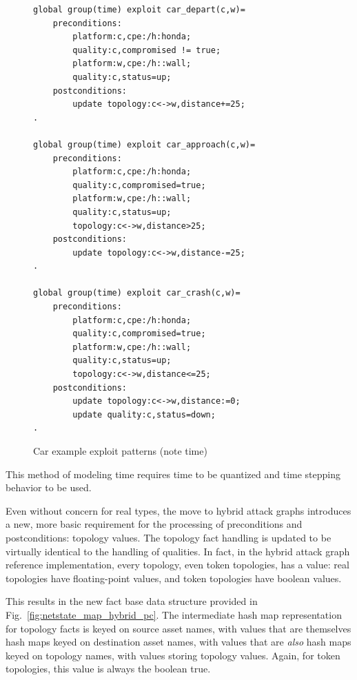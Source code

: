 \begin{figure}
\begin{lstlisting}
global group(time) exploit car_depart(c,w)=
    preconditions:
        platform:c,cpe:/h:honda;
        quality:c,compromised != true;
        platform:w,cpe:/h::wall;
        quality:c,status=up;
    postconditions:
        update topology:c<->w,distance+=25;
.

global group(time) exploit car_approach(c,w)=
    preconditions:
        platform:c,cpe:/h:honda;
        quality:c,compromised=true;
        platform:w,cpe:/h::wall;
        quality:c,status=up;
        topology:c<->w,distance>25;
    postconditions:
        update topology:c<->w,distance-=25;
.

global group(time) exploit car_crash(c,w)=
    preconditions:
        platform:c,cpe:/h:honda;
        quality:c,compromised=true;
        platform:w,cpe:/h::wall;
        quality:c,status=up;
        topology:c<->w,distance<=25;
    postconditions:
        update topology:c<->w,distance:=0;
        update quality:c,status=down;
.
\end{lstlisting}
\caption{Car example exploit patterns (note time)}
\label{fig:illustrative_time_xp}
\end{figure}

This method of modeling time requires time to be quantized and time stepping
behavior to be used. 

Even without concern for real types, the move to hybrid attack graphs 
introduces a new, more basic requirement for the processing of preconditions
and postconditions: topology values. The topology fact handling is updated
to be virtually identical to the handling of qualities. In fact, in the hybrid 
attack graph
reference implementation, every topology, even token topologies, has a value:
real topologies have floating-point values, and token topologies have boolean
values.

This results in the new fact base data structure provided in 
Fig.~\ref{fig:netstate_map_hybrid_pc}. The intermediate hash map representation
for topology facts is keyed on source asset names, with values that are
themselves hash maps keyed on destination asset names, with values that are
\emph{also} hash maps keyed on topology names, with values storing topology
values. Again, for token topologies, this value is always the boolean true.

